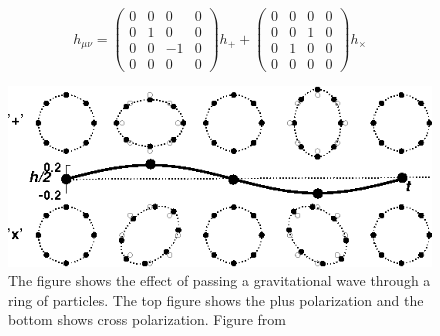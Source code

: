\documentclass{ttuthes2007}
\begin{document}
\begin{equation*}                                                               
h_{\mu\nu}=     
 \begin{pmatrix}                                                                
    0 & 0 & 0 & 0 \\                                                            
    0 & 1 & 0 & 0 \\                                                            
    0 & 0 & -1 & 0 \\                                                            
    0 & 0 & 0 & 0                                                               
 \end{pmatrix}
h_+  
+
 \begin{pmatrix}                                                                
    0 & 0 & 0 & 0 \\                                                            
    0 & 0 & 1 & 0 \\                                                            
    0 & 1 & 0 & 0 \\                                                            
    0 & 0 & 0 & 0                                                               
 \end{pmatrix}
h_\times                                                                  
\end{equation*} 

\begin{figure}[h!]                                                              
	\includegraphics[width=\textwidth]{figure/polarization.png}
	\caption{The figure shows the effect of passing a gravitational wave
through a ring of particles. The top figure shows the plus polarization and the
bottom shows cross polarization. Figure from ~\cite{Schutz}}                                                     
        \label{fig:polarization}
\end{figure}
\end{document}
